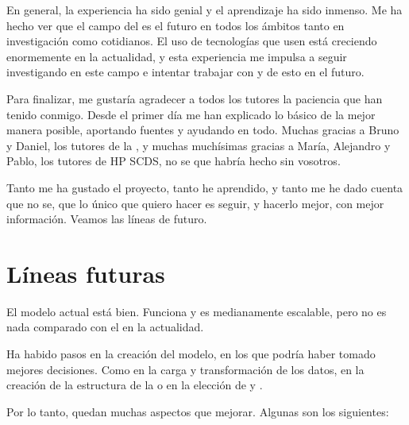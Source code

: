 En general, la experiencia ha sido genial y el aprendizaje ha sido inmenso. Me ha hecho ver que el campo del  es el futuro en todos los ámbitos tanto en investigación como cotidianos. El uso de tecnologías que usen  está creciendo enormemente en la actualidad, y esta experiencia me impulsa a seguir investigando en este campo e intentar trabajar con y de esto en el futuro.

Para finalizar, me gustaría agradecer a todos los tutores la paciencia que han tenido conmigo. Desde el primer día me han explicado lo básico de la mejor manera posible, aportando fuentes y ayudando en todo.
Muchas gracias a Bruno y Daniel, los tutores de la , y muchas muchísimas gracias a María, Alejandro y Pablo, los tutores de HP SCDS, no se que habría hecho sin vosotros.

Tanto me ha gustado el proyecto, tanto he aprendido, y tanto me he dado cuenta que no se, que lo único que quiero hacer es seguir, y hacerlo mejor, con mejor información. Veamos las líneas de futuro.

\section{Líneas futuras}

El modelo actual está bien. Funciona y es medianamente escalable, pero no es nada comparado con el    en la actualidad.

Ha habido pasos en la creación del modelo, en los que podría haber tomado mejores decisiones. Como en la carga y transformación de los datos, en la creación de la estructura de la  o en la elección de  y .

Por lo tanto, quedan muchas aspectos que mejorar. Algunas son los siguientes:

